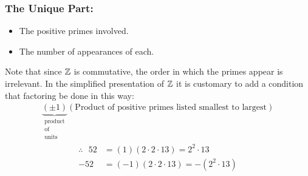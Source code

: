 \subsubsection*{The Unique Part:}
\begin{itemize}
    \item The positive primes involved.
    \item The number of appearances of each.
\end{itemize}
Note that since ${\mathbb{Z}}$ is commutative, the order in which the primes appear is irrelevant. In the
simplified presentation of ${\mathbb{Z}}$ it is customary to add a condition that factoring be done in this
way:
\begin{align*}
    \underbrace{(\pm 1)}_{\substack{\text{product}\\ \text{of} \\ \text{units}}}(\text{Product of positive primes listed smallest to largest})
\end{align*}
\begin{align*}
    \therefore \ \ \ 52&= (1)(2\cdot 2\cdot 13) = 2^2 \cdot 13 \\
    -52 &= (-1)(2\cdot 2\cdot 13 )= -(2^2\cdot 13)
\end{align*}
\setcounter{dummy}{1}
